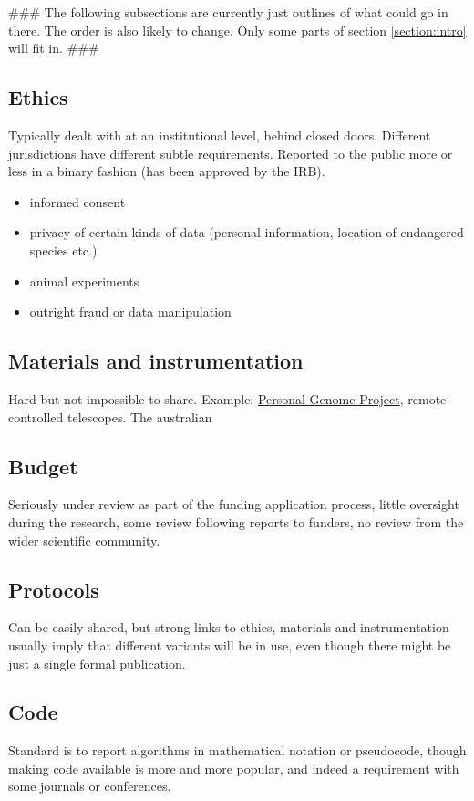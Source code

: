 \documentclass[final,authoryear,3p]{elsarticle-open-drafting}
\begin{document}
\#\#\# The following subsections are currently just outlines of what could go in there. The order is also likely to change. Only some parts of section \ref{section:intro} will fit in. \#\#\#

\subsection{Ethics}
Typically dealt with at an institutional level, behind closed doors. Different jurisdictions have different subtle requirements. Reported to the public more or less in a binary fashion (has been approved by the IRB). 

\begin{itemize}
	\item informed consent
	\item privacy of certain kinds of data (personal information, location of endangered species etc.)
	\item animal experiments
	\item outright fraud or data manipulation
\end{itemize}

\subsection{Materials and instrumentation}
Hard but not impossible to share. Example: \href{http://www.personalgenomes.org/}{Personal Genome Project}, remote-controlled telescopes. The australian 

\subsection{Budget}
Seriously under review as part of the funding application process, little oversight during the research, some review following reports to funders, no review from the wider scientific community. 

\subsection{Protocols}
Can be easily shared, but strong links to ethics, materials and instrumentation usually imply that different variants will be in use, even though there might be just a single formal publication.
 
\subsection{Code}
Standard is to report algorithms in mathematical notation or pseudocode, though making code available is more and more popular, and indeed a requirement with some journals or conferences.
\end{document}
